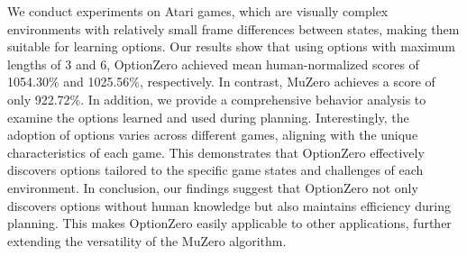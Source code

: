 We conduct experiments on Atari games, which are visually complex environments with relatively small frame differences between states, making them suitable for learning options.
Our results show that using options with maximum lengths of 3 and 6, OptionZero achieved mean human-normalized scores of 1054.30\% and 1025.56\%, respectively.
In contrast, MuZero achieves a score of only 922.72\%.
In addition, we provide a comprehensive behavior analysis to examine the options learned and used during planning.
Interestingly, the adoption of options varies across different games, aligning with the unique characteristics of each game.
This demonstrates that OptionZero effectively discovers options tailored to the specific game states and challenges of each environment.
In conclusion, our findings suggest that OptionZero not only discovers options without human knowledge but also maintains efficiency during planning.
This makes OptionZero easily applicable to other applications, further extending the versatility of the MuZero algorithm.


